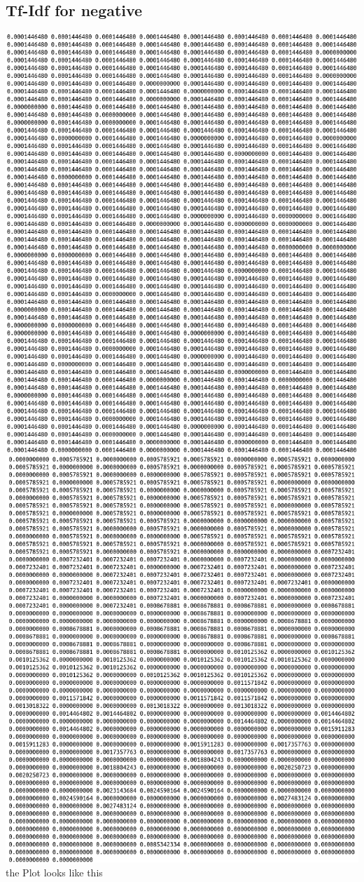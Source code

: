 \documentclass{article}
\begin{document}
\subsection{Tf-Idf for negative}
\includegraphics[width=0.8\linewidth]{tf_idf_neg1.png}\\
\includegraphics[width=0.8\linewidth]{tf_idf_neg2.png}\\
the Plot looks like this
\end{document}
